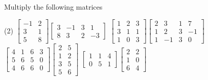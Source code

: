 \documentclass{ximera}
\begin{document}
\begin{exercise}
    Multiply the following matrices
    \begin{tasks}(2)
        \task
        $\begin{bmatrix}
            -1 & 2 \\
            3 & 1 \\
            5 & 8
        \end{bmatrix}
        \begin{bmatrix}
            3 & -1 & 3 & 1 \\
            8 & 3 & 2 & -3
        \end{bmatrix}$
        \task
        $\begin{bmatrix}
            1 & 2 & 3 \\
            3 & 1 & 1 \\
            1 & 0 & 3
        \end{bmatrix}
        \begin{bmatrix}
            2 & 3 & 1 & 7 \\
            1 & 2 & 3 & -1 \\
            1 & -1 & 3 & 0
        \end{bmatrix}$
        \task
        $\begin{bmatrix}
            4 & 1 & 6 & 3 \\
            5 & 6 & 5 & 0 \\
            4 & 6 & 6 & 0
        \end{bmatrix}
        \begin{bmatrix}
            2 & 5 \\
            1 & 2 \\
            3 & 5 \\
            5 & 6
        \end{bmatrix}$
        \task
        $\begin{bmatrix}
            1 & 1 & 4 \\
            0 & 5 & 1
        \end{bmatrix}
        \begin{bmatrix}
            2 & 2 \\
            1 & 0 \\
            6 & 4
        \end{bmatrix}$
    \end{tasks}
\end{exercise}
\end{document}
